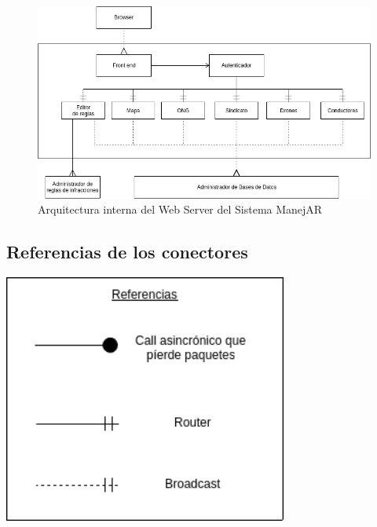 \begin{figure}
\centerline{\includegraphics[width=1\textwidth]{./imagenes/arquitectura_tp2/web_server.png}}
\caption{Arquitectura interna del Web Server del Sistema ManejAR}
\end{figure}


\subsection{Referencias de los conectores}



\centerline{ \includegraphics[width=0.7\textwidth]{./imagenes/arquitectura_tp2/referencias.png} } 
